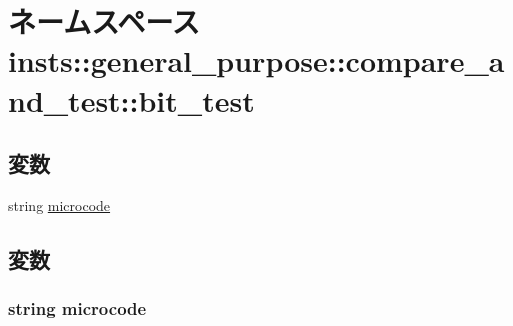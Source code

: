 \hypertarget{namespaceinsts_1_1general__purpose_1_1compare__and__test_1_1bit__test}{
\section{ネームスペース insts::general\_\-purpose::compare\_\-and\_\-test::bit\_\-test}
\label{namespaceinsts_1_1general__purpose_1_1compare__and__test_1_1bit__test}
}
\subsection*{変数}
\begin{DoxyCompactItemize}
\item 
string \hyperlink{namespaceinsts_1_1general__purpose_1_1compare__and__test_1_1bit__test_a770f11a173e99389a8802f0107ed8f52}{microcode}
\end{DoxyCompactItemize}


\subsection{変数}
\hypertarget{namespaceinsts_1_1general__purpose_1_1compare__and__test_1_1bit__test_a770f11a173e99389a8802f0107ed8f52}{
\subsubsection[{microcode}]{\setlength{\rightskip}{0pt plus 5cm}string {\bf microcode}}}
\label{namespaceinsts_1_1general__purpose_1_1compare__and__test_1_1bit__test_a770f11a173e99389a8802f0107ed8f52}
